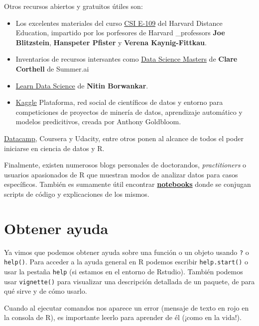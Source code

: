 \documentclass[]{book}
\theoremstyle{definition}
\theoremstyle{definition}
\theoremstyle{definition}
\theoremstyle{remark}
\begin{document}
Otros recursos abiertos y gratuitos útiles son:

\begin{itemize}
\item
  Los excelentes materiales del curso
  \href{http://cm.dce.harvard.edu/2014/01/14328/publicationListing.shtml}{CSI
  E-109} del Harvard Distance Education, impartido por los porfesores de
  Harvard \_professors \textbf{Joe Blitzstein}, \textbf{Hanspeter
  Pfister} y \textbf{Verena Kaynig-Fittkau}.
\item
  Inventarios de recursos intersantes como
  \href{http://datasciencemasters.org}{Data Science Masters} de
  \textbf{Clare Corthell} de Summer.ai
\item
  \href{http://learnds.com/}{Learn Data Science} de \textbf{Nitin
  Borwankar}.
\item
  \href{https://www.kaggle.com}{Kaggle} Plataforma, red social de
  científicos de datos y entorno para competiciones de proyectos de
  minería de datos, aprendizaje automático y modelos predicitivos,
  creada por Anthony Goldbloom.
\end{itemize}

\href{https://www.datacamp.com}{Datacamp}, Coursera y Udacity, entre
otros ponen al alcance de todos el poder iniciarse en ciencia de datos y
R.

Finalmente, existen numerosos blogs personales de doctorandos,
\emph{practitioners} o usuarios apasionados de R que muestran modos de
analizar datos para casos específicos. También es sumamente útil
encontrar
\href{http://rmarkdown.rstudio.com/r_notebooks.html}{\textbf{notebooks}}
donde se conjugan scripts de código y explicaciones de los mismos.

\hypertarget{obtener-ayuda}{%
\section{Obtener ayuda}\label{obtener-ayuda}}

Ya vimos que podemos obtener ayuda sobre una función o un objeto usando
\texttt{?} o \texttt{help()}. Para acceder a la ayuda general en R
podemos escribir \texttt{help.start()} o usar la pestaña \texttt{help}
(si estamos en el entorno de Rstudio). También podemos usar
\texttt{vignette()} para visualizar una descripción detallada de un
paquete, de para qué sirve y de cómo usarlo.

Cuando al ejecutar comandos nos aparece un error (mensaje de texto en
rojo en la consola de R), es importante leerlo para aprender de él
(¡como en la vida!).
\end{document}
